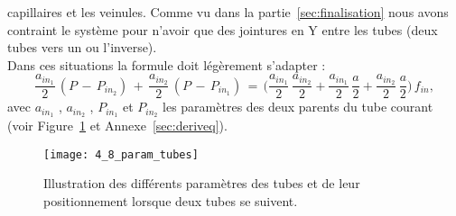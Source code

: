capillaires et les veinules. Comme vu dans la partie~\ref{sec:finalisation} nous avons contraint le système pour n’avoir
que des jointures en Y entre les tubes (deux tubes vers un ou l’inverse).\\
Dans ces situations la formule doit légèrement s’adapter :
\begin{equation}
\label{eq:ley}
\frac{a_{in_1}}{2}\,(P\,-\,P_{in_2})\,+\,\frac{a_{in_2}}{2}\,(P\,-\,P_{in_1})\,=\,\biggl(\frac{a_{in_1}}{2}\,\frac{a_{in_2}}{2}+\frac{a_{in_1}}{2}\,\frac{a}{2}+\frac{a_{in_2}}{2}\,\frac{a}{2}\biggr)\,f_{in},
\end{equation}
avec $a_{in_1}$ , $a_{in_2}$ , $P_{in_1}$ et $P_{in_2}$ les paramètres des deux parents du tube courant (voir Figure~\ref{fig:4_8_param_tubes} et Annexe~\ref{sec:deriveq}).\\
\begin{figure}[!t]
\centering
\texttt{[image: 4\_8\_param\_tubes]}
\caption{Illustration des différents paramètres des tubes et de leur positionnement lorsque deux tubes se suivent.}
\label{fig:4_8_param_tubes}	
\end{figure}

